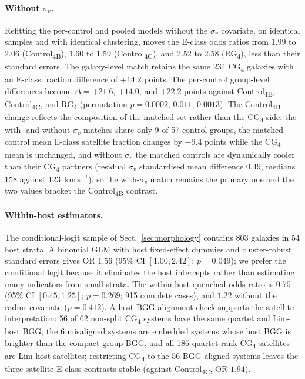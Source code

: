 \documentclass{aa}
\newcommand{\CB}{Control\textsubscript{4B}}
\newcommand{\CC}{Control\textsubscript{4C}}
\newcommand{\CG}{CG\textsubscript{4}}
\newcommand{\RG}{RG\textsubscript{4}}
\newcommand{\kms}{\,\mathrm{km\,s}^{-1}}
\begin{document}
\begin{appendix}
\paragraph{Without \(\sigma_v\).} Refitting the per-control and pooled models without the \(\sigma_v\) covariate, on identical samples and with identical clustering, moves the E-class odds ratios from 1.99 to 2.06 (\CB{}), 1.60 to 1.59 (\CC{}), and 2.52 to 2.58 (\RG{}), less than their standard errors. The galaxy-level match retains the same 234 \CG{} galaxies with an E-class fraction difference of \(+14.2\) points. The per-control group-level differences become \(\Delta = +21.6\), \(+14.0\), and \(+22.2\) points against \CB{}, \CC{}, and \RG{} (permutation \(p = 0.0002\), \(0.011\), \(0.0013\)). The \CB{} change reflects the composition of the matched set rather than the \CG{} side: the with- and without-\(\sigma_v\) matches share only 9 of 57 control groups, the matched-control mean E-class satellite fraction changes by \(-9.4\) points while the \CG{} mean is unchanged, and without \(\sigma_v\) the matched controls are dynamically cooler than their \CG{} partners (residual \(\sigma_v\) standardised mean difference \(0.49\), medians 158 against 123 \(\kms\)), so the with-\(\sigma_v\) match remains the primary one and the two values bracket the \CB{} contrast.







\paragraph{Within-host estimators.} The conditional-logit sample of Sect.~\ref{sec:morphology} contains 803 galaxies in 54 host strata. A binomial GLM with host fixed-effect dummies and cluster-robust standard errors gives OR \(1.56\) (95\% CI \([1.00, 2.42]\); \(p = 0.049\)); we prefer the conditional logit because it eliminates the host intercepts rather than estimating many indicators from small strata. The within-host quenched odds ratio is \(0.75\) (95\% CI \([0.45, 1.25]\); \(p = 0.269\); 915 complete cases), and \(1.22\) without the radius covariate (\(p = 0.412\)). A host-BGG alignment check supports the satellite interpretation: 56 of 62 non-split \CG{} systems have the same quartet and Lim-host BGG, the 6 misaligned systems are embedded systems whose host BGG is brighter than the compact-group BGG, and all 186 quartet-rank \CG{} satellites are Lim-host satellites; restricting \CG{} to the 56 BGG-aligned systems leaves the three satellite E-class contrasts stable (against \CC{}, OR \(1.94\)).




\end{appendix}
\end{document}
